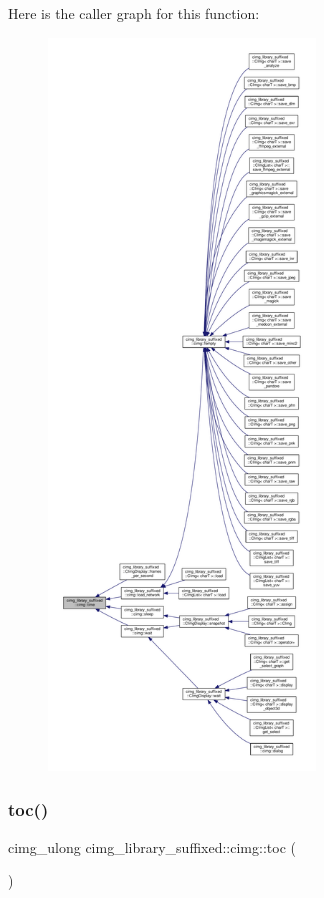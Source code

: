 Here is the caller graph for this function\+:
\nopagebreak
\begin{figure}[H]
\begin{center}
\leavevmode
\includegraphics[height=550pt]{d4/d9b/namespacecimg__library__suffixed_1_1cimg_a71a3c7b37befc7a4313dfcdd80271bce_icgraph}
\end{center}
\end{figure}
\mbox{\label{namespacecimg__library__suffixed_1_1cimg_affb2a0951f575b9c39b83d0fd836a26d}} 
\subsubsection{\texorpdfstring{toc()}{toc()}}
{\footnotesize\ttfamily cimg\+\_\+ulong cimg\+\_\+library\+\_\+suffixed\+::cimg\+::toc (\begin{DoxyParamCaption}{ }\end{DoxyParamCaption})\hspace{0.3cm}{\ttfamily [inline]}}



